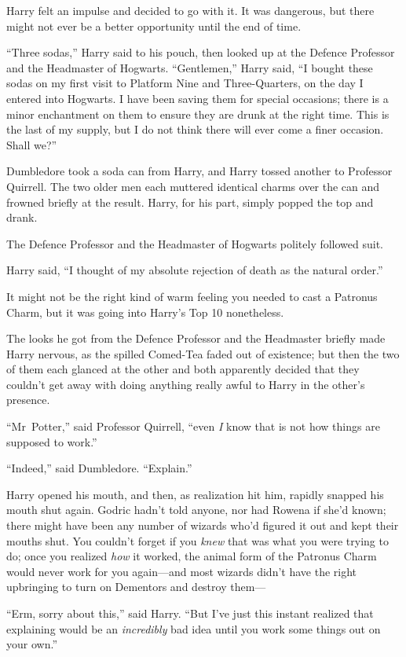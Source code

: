 Harry felt an impulse and decided to go with it. It was dangerous, but there might not ever be a better opportunity until the end of time.

“Three sodas,” Harry said to his pouch, then looked up at the Defence Professor and the Headmaster of Hogwarts. “Gentlemen,” Harry said, “I bought these sodas on my first visit to Platform Nine and Three-Quarters, on the day I entered into Hogwarts. I have been saving them for special occasions; there is a minor enchantment on them to ensure they are drunk at the right time. This is the last of my supply, but I do not think there will ever come a finer occasion. Shall we?”

Dumbledore took a soda can from Harry, and Harry tossed another to Professor Quirrell. The two older men each muttered identical charms over the can and frowned briefly at the result. Harry, for his part, simply popped the top and drank.

The Defence Professor and the Headmaster of Hogwarts politely followed suit.

Harry said, “I thought of my absolute rejection of death as the natural order.”

It might not be the right kind of warm feeling you needed to cast a Patronus Charm, but it was going into Harry’s Top 10 nonetheless.

The looks he got from the Defence Professor and the Headmaster briefly made Harry nervous, as the spilled Comed-Tea faded out of existence; but then the two of them each glanced at the other and both apparently decided that they couldn’t get away with doing anything really awful to Harry in the other’s presence.

“Mr~Potter,” said Professor Quirrell, “even \emph{I} know that is not how things are supposed to work.”

“Indeed,” said Dumbledore. “Explain.”

Harry opened his mouth, and then, as realization hit him, rapidly snapped his mouth shut again. Godric hadn’t told anyone, nor had Rowena if she’d known; there might have been any number of wizards who’d figured it out and kept their mouths shut. You couldn’t forget if you \emph{knew} that was what you were trying to do; once you realized \emph{how} it worked, the animal form of the Patronus Charm would never work for you again—and most wizards didn’t have the right upbringing to turn on Dementors and destroy them—

“Erm, sorry about this,” said Harry. “But I’ve just this instant realized that explaining would be an \emph{incredibly} bad idea until you work some things out on your own.”

